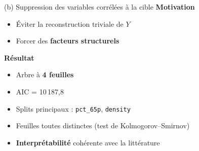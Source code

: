 \documentclass[10pt, aspectratio=1610]{beamer}
\begin{document}
\begin{frame}{(b) Suppression des variables corrélées à la cible}
    \textbf{Motivation}
    \begin{itemize}
        \item Éviter la reconstruction triviale de $Y$
        \item Forcer des \textbf{facteurs structurels}
    \end{itemize}

    \vspace{0.4cm}

    \textbf{Résultat}
    \begin{itemize}
        \item Arbre à \textbf{4 feuilles}
        \item AIC = 10\,187,8
        \item Splits principaux : \texttt{pct\_65p}, \texttt{density}
        \item Feuilles toutes distinctes (test de Kolmogorov--Smirnov)
        \item \textbf{Interprétabilité} cohérente avec la littérature
    \end{itemize}
\end{frame}
\end{document}

